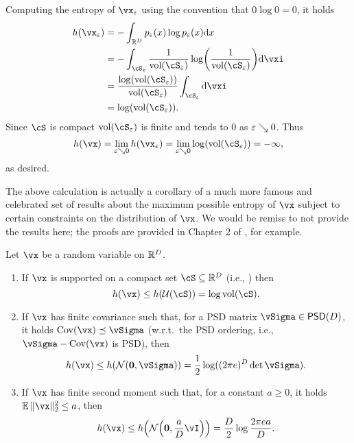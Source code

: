 \documentclass[../../book-main.tex]{subfiles}
\begin{document}
Computing the entropy of \(\vx_{\eps}\) using the convention that \(0 \log 0 = 0\), it holds
\begin{align}
    h(\vx_{\eps}) 
    &= -\int_{\R^{D}}p_{\eps}(x)\log p_{\eps}(x)\odif{x} \\ 
    &= -\int_{\cS_{\eps}}\frac{1}{\volume(\cS_{\eps})} \log\rp{\frac{1}{\volume(\cS_{\eps})}}\odif{\vxi} \\ 
    &= \frac{\log(\volume(\cS_{\eps}))}{\volume(\cS_{\eps})}\int_{\cS_{\eps}}\odif{\vxi} \\ 
    &= \log(\volume(\cS_{\eps})).
\end{align}
Since \(\cS\) is compact \(\volume(\cS_{\eps})\) is finite and tends to \(0\) as \(\varepsilon \searrow 0\). Thus
\begin{equation}
    h(\vx) = \lim_{\eps \searrow 0}h(\vx_{\eps}) = \lim_{\eps \searrow 0}\log(\volume(\cS_{\eps})) = -\infty,
\end{equation}
as desired.

The above calculation is actually a corollary of a much more famous and celebrated set of results about the maximum possible entropy of \(\vx\) subject to certain constraints on the distribution of \(\vx\). We would be remiss to not provide the results here; the proofs are provided in Chapter 2 of \cite{poliyanski2024information}, for example.
\begin{theorem}\label{thm:max_entropy}
    Let \(\vx\) be a random variable on \(\mathbb{R}^{D}\).
    \begin{enumerate}
        \item If \(\vx\) is supported on a compact set \(\cS \subseteq \R^{D}\) (i.e., ) then
        \begin{equation}
            h(\vx) \leq h(\dUnif(\cS)) = \log \volume(\cS).
        \end{equation}
        \item If \(\vx\) has finite covariance such that, for a PSD matrix \(\vSigma \in \PSD(D)\), it holds \(\Cov(\vx) \preceq \vSigma\) (w.r.t.~the PSD ordering, i.e., \(\vSigma - \Cov(\vx)\) is PSD), then
        \begin{equation}
            h(\vx) \leq h(\dNorm(\vzero, \vSigma)) = \frac{1}{2}\log((2\pi e)^{D}\det\vSigma).
        \end{equation}
        \item If \(\vx\) has finite second moment such that, for a constant \(a \geq 0\), it holds \(\Ex\norm{\vx}_{2}^{2} \leq a\), then
        \begin{equation}
            h(\vx) \leq h\rp{\dNorm\rp{\vzero, \frac{a}{D}\vI}} = \frac{D}{2}\log\frac{2\pi e a}{D}.
        \end{equation}
    \end{enumerate}
\end{theorem}
\end{document}
